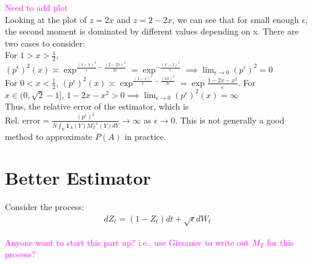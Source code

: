 \documentclass[11pt]{amsart}
\newcommand{\noise}{\sqrt{\epsilon}}
\newcommand{\kknote}[1]{{\textcolor{magenta}{#1}}}
\begin{document}
\kknote{Need to add plot}
\\
Looking at the plot of $z = 2x$ and $z = 2-2x$, we can see that for small enough $\epsilon$, the second moment is dominated by different values depending on x. There are two cases to consider: 
\\
For $1 > x > \frac{1}{2}$, $(p^{\epsilon})^2(x) \asymp \exp^{\frac{(1-x)^2}{\epsilon}-\frac{(2-2x)^2}{2\epsilon}} = \exp^{-\frac{(x-1)^2}{\epsilon}} \implies \lim_{\epsilon \to 0} (p^{\epsilon})^2 = 0$
\\
For $0 < x < \frac{1}{2}$, $(p^{\epsilon})^2(x) \asymp \exp^{\frac{(1-x)^2}{\epsilon}-\frac{(2x)^2}{2\epsilon}} = \exp{\frac{1-2x-x^2}{\epsilon}}$. For $x \in (0,\sqrt{2}-1]$, $1-2x-x^2 > 0 \implies \lim_{\epsilon \to 0} (p^{\epsilon})^2(x) = \infty$ 
\\
Thus, the relative error of the estimator, which is $\text{Rel. error} = \frac{(p^{\epsilon})^2}{N\int_{\mathbb{R}}\mathbf{1}_{A}(Y)M^{-1}_{T}(Y) dY} \to \infty$ as $\epsilon \to 0$. This is not generally a good method to approximate $P(A)$ in practice. 

\section{Better Estimator}
Consider the process: 
\begin{align*}
dZ_t = (1-Z_t)dt + \noise dW_t
\end{align*}

\kknote{Anyone want to start this part up? i.e., use Girsanov to write out $M_T$ for this process?}
\end{document}
